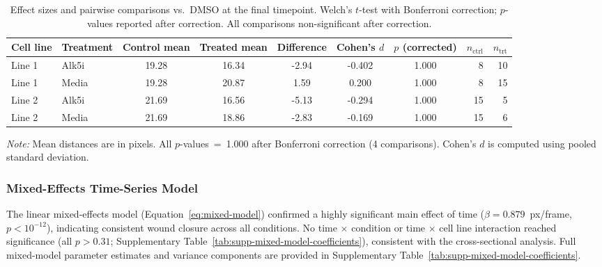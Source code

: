 \begin{table}[htbp]
\centering
\caption{Effect sizes and pairwise comparisons vs.\ DMSO at the final timepoint.
  Welch's $t$-test with Bonferroni correction; $p$-values reported after correction.
  All comparisons non-significant after correction.}
\label{tab:effects}
\begin{tabular}{ll
  S[table-format=2.2]
  S[table-format=2.2]
  S[table-format=2.2]
  S[table-format=-1.3]
  S[table-format=1.3]
  rr}
\toprule
{Cell line} & {Treatment} & {Control mean} & {Treated mean} & {Difference} & {Cohen's $d$} & {$p$ (corrected)} & {$n_\text{ctrl}$} & {$n_\text{trt}$} \\
\midrule
Line 1 & Alk5i & 19.28 & 16.34 & -2.94 & -0.402 & 1.000 & 8 & 10 \\
Line 1 & Media & 19.28 & 20.87 &  1.59 &  0.200 & 1.000 & 8 & 15 \\
Line 2 & Alk5i & 21.69 & 16.56 & -5.13 & -0.294 & 1.000 & 15 &  5 \\
Line 2 & Media & 21.69 & 18.86 & -2.83 & -0.169 & 1.000 & 15 &  6 \\
\bottomrule
\end{tabular}
\smallskip

\noindent\textit{Note:} Mean distances are in pixels.
All $p$-values~=~1.000 after Bonferroni correction (4 comparisons).
Cohen's $d$ is computed using pooled standard deviation.
\end{table}

\subsubsection{Mixed-Effects Time-Series Model}

The linear mixed-effects model (Equation~\eqref{eq:mixed-model}) confirmed a highly
significant main effect of time ($\beta = 0.879$~px/frame, $p < 10^{-12}$),
indicating consistent wound closure across all conditions.
No time $\times$ condition or time $\times$ cell line interaction reached significance
(all $p > 0.31$; Supplementary Table~\ref{tab:supp-mixed-model-coefficients}),
consistent with the cross-sectional analysis.
Full mixed-model parameter estimates and variance components are provided in
Supplementary Table~\ref{tab:supp-mixed-model-coefficients}.
